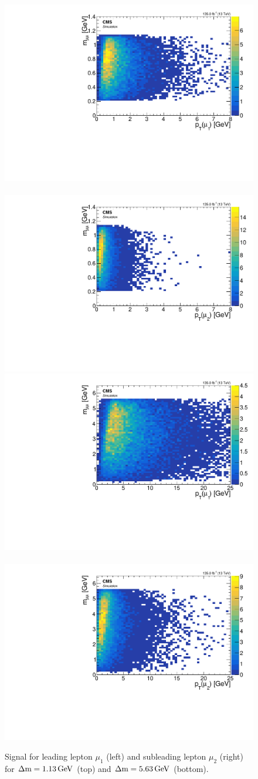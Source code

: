 \begin{figure}[!htb]
\centering
\includegraphics[width=0.48\linewidth]{plots/signal_muons_gen_delta_r_vs_pt/none_gen_invmass_vs_pt_1.pdf} \,
\includegraphics[width=0.48\linewidth]{plots/signal_muons_gen_delta_r_vs_pt/none_gen_invmass_vs_pt_2.pdf}  \\
\includegraphics[width=0.48\linewidth]{plots/signal_muons_gen_delta_r_vs_pt_dm5/none_gen_invmass_vs_pt_1.pdf} \,
\includegraphics[width=0.48\linewidth]{plots/signal_muons_gen_delta_r_vs_pt_dm5/none_gen_invmass_vs_pt_2.pdf}  \\
\caption[Signal \mmumu \vs \pt]{ Signal \mmumu \vs \pt for leading lepton $\mu_1$ (left) and subleading lepton $\mu_2$ (right) for $\Delta\mathrm{m}=1.13\,\text{Ge\hspace{-.08em}V}$ (top) and $\Delta\mathrm{m}=5.63\,\text{Ge\hspace{-.08em}V}$ (bottom).}
\label{fig:signal-gen-invamass-pt}
\end{figure}

